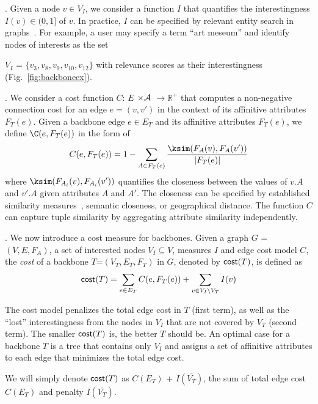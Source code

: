 . Given a node $v\in V_I$,
we consider a function $I$ that quantifies the interestingness $I(v)\in(0,1]$
of $v$. In practice, $I$ can be
specified by relevant entity search in graphs~\cite{lissandrini2018x}. For example, 
a user may specify a term 
``art meseum'' and identify nodes of interests as 
the set {$V_I$ = $\{v_3, v_8,v_9,v_{10},v_{12}\}$
with relevance scores as their
interestingness (Fig.~\ref{fig:backboneex}).

. We consider a cost function $C$: $E$ $\times \A$ $\rightarrow \mathbb{R}^{+}$
that computes a non-negative connection cost for
an edge $e = (v, v')$ in the context of
its affinitive attributes $F_T(e)$.
Given a backbone edge $e\in E_T$ and its
affinitive attributes
$F_T(e)$, we
define $\C(e, F_T(e))$ in the form of
\[
C(e, F_T(e)) = 1-
\sum
_{A\in F_T(e)}\frac{\ksim(F_A(v), F_A(v'))}{|F_T(e)|}
\]
where $\ksim(F_{A_i}(v), F_{A_i}(v'))$ quantifies the
closeness between the values of $v.A$ and $v'.A$
given attributes $A$ and $A'$.
The closeness can be
specified by established similarity measures~\cite{augsten2013similarity},
semantic closeness,
or geographical distance.
The function $C$ can capture
tuple similarity by aggregating
attribute similarity independently.

.
We now introduce a cost measure for backbones.
Given a graph $G$ = $(V,E,F_A)$,
a set of interested nodes $V_I\subseteq V$,
measures $I$ and edge cost model $C$, the
{\em cost} of a backbone $T$=$(V_T, E_T, F_T)$ in $G$, denoted by ${\mathsf{cost}}(T)$,
is defined as
\[
{\mathsf{cost}}(T) = \sum_{e\in E_T}C(e, F_T(e)) +  \sum_{v\in V_I\setminus V_T}I(v)
\]

The cost model penalizes
the total edge cost in $T$ (first term), as well as the
``lost'' interestingness from the nodes in $V_I$
that are not covered by $V_T$  (second term).
The smaller  ${\mathsf{cost}}(T)$ is, the better $T$ should be.
An optimal case for a backbone $T$ is a tree
that contains only $V_I$ and 
assigns a set of affinitive attributes to each edge that
minimizes the total edge cost. 

\vspace{.5ex}
We will simply denote ${\mathsf{cost}}(T)$ as
$C(E_T)$ + $I(\overline{V_T})$, the sum of
total edge cost $C(E_T)$ and penalty
$I(\overline{V_T})$.

}
